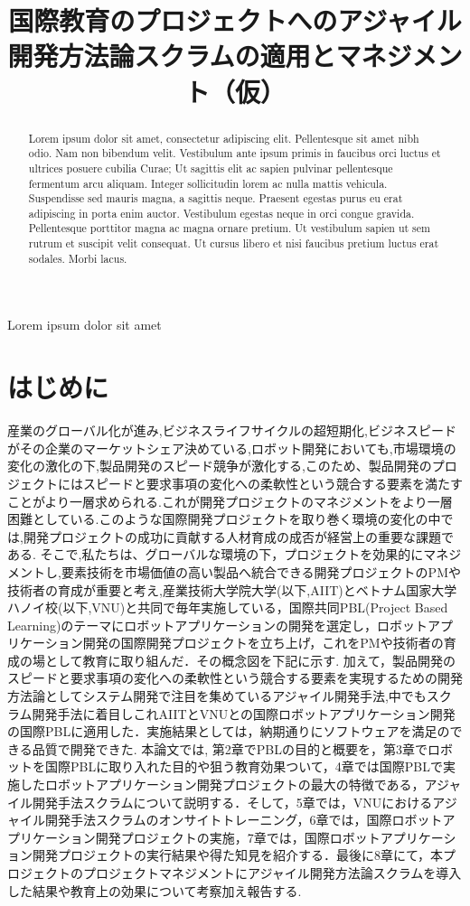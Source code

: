 \documentclass[paper]{jrsj}
\title{
国際教育のプロジェクトへのアジャイル開発方法論スクラムの適用とマネジメント（仮）
}
\subtitle{}
\begin{document}
\begin{abstract}
Lorem ipsum dolor sit amet, consectetur adipiscing elit. Pellentesque sit amet nibh odio. Nam non bibendum velit. Vestibulum ante ipsum primis in faucibus orci luctus et ultrices posuere cubilia Curae; Ut sagittis elit ac sapien pulvinar pellentesque fermentum arcu aliquam. Integer sollicitudin lorem ac nulla mattis vehicula. Suspendisse sed mauris magna, a sagittis neque. Praesent egestas purus eu erat adipiscing in porta enim auctor. Vestibulum egestas neque in orci congue gravida. Pellentesque porttitor magna ac magna ornare pretium. Ut vestibulum sapien ut sem rutrum et suscipit velit consequat. Ut cursus libero et nisi faucibus pretium luctus erat sodales. Morbi lacus.
\end{abstract}
\begin{keywords}
Lorem ipsum dolor sit amet
\end{keywords}
\maketitle
\small
\section{はじめに}

産業のグローバル化が進み,ビジネスライフサイクルの超短期化,ビジネスピードがその企業のマーケットシェア決めている,ロボット開発においても,市場環境の変化の激化の下,製品開発のスピード競争が激化する,このため、製品開発のプロジェクトにはスピードと要求事項の変化への柔軟性という競合する要素を満たすことがより一層求められる.これが開発プロジェクトのマネジメントをより一層困難としている.このような国際開発プロジェクトを取り巻く環境の変化の中では,開発プロジェクトの成功に貢献する人材育成の成否が経営上の重要な課題である.
そこで,私たちは、グローバルな環境の下，プロジェクトを効果的にマネジメントし,要素技術を市場価値の高い製品へ統合できる開発プロジェクトのPMや技術者の育成が重要と考え,産業技術大学院大学(以下,AIIT)とベトナム国家大学ハノイ校(以下,VNU)と共同で毎年実施している，国際共同PBL(Project Based　Learning)のテーマにロボットアプリケーションの開発を選定し，ロボットアプリケーション開発の国際開発プロジェクトを立ち上げ，これをPMや技術者の育成の場として教育に取り組んだ．その概念図を下記に示す.
加えて，製品開発のスピードと要求事項の変化への柔軟性という競合する要素を実現するための開発方法論としてシステム開発で注目を集めているアジャイル開発手法,中でもスクラム開発手法に着目しこれAIITとVNUとの国際ロボットアプリケーション開発の国際PBLに適用した．実施結果としては，納期通りにソフトウェアを満足のできる品質で開発できた.
本論文では, 第2章でPBLの目的と概要を，第3章でロボットを国際PBLに取り入れた目的や狙う教育効果ついて，4章では国際PBLで実施したロボットアプリケーション開発プロジェクトの最大の特徴である，アジャイル開発手法スクラムについて説明する．そして，5章では，VNUにおけるアジャイル開発手法スクラムのオンサイトトレーニング，6章では，国際ロボットアプリケーション開発プロジェクトの実施，7章では，国際ロボットアプリケーション開発プロジェクトの実行結果や得た知見を紹介する．最後に8章にて，本プロジェクトのプロジェクトマネジメントにアジャイル開発方法論スクラムを導入した結果や教育上の効果について考察加え報告する.
\end{document}
